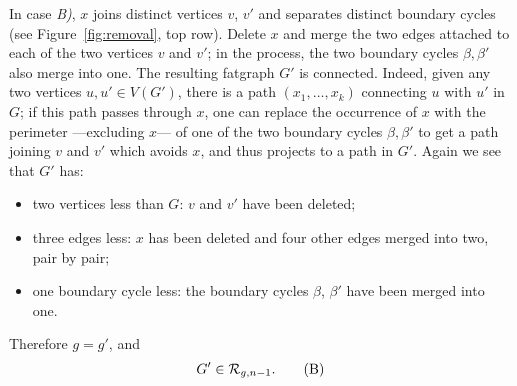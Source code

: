 In case {\slshape B)}, $x$ joins distinct vertices $v$,
$v'$ and separates distinct boundary cycles (see Figure~\ref{fig:removal},
top row).  Delete $x$ and merge the two edges attached to each of
the two vertices $v$ and $v'$; in the process, the two boundary cycles
$\beta, \beta'$ also merge into one. The resulting fatgraph $G'$ is
connected. Indeed, given any two vertices $u, u' \in V(G')$, there is
a path $(x_1, \ldots, x_k)$ connecting $u$ with $u'$ in $G$; if this
path passes through $x$, one can replace the occurrence of $x$ with
the perimeter ---excluding $x$--- of one of the two boundary cycles
$\beta, \beta'$ to get a path joining $v$ and $v'$ which avoids $x$,
and thus projects to a path in $G'$.  Again we see that $G'$ has:
\begin{itemize}
\item two vertices less than $G$: $v$ and $v'$ have been deleted;
\item three edges less: $x$ has been deleted and four other
  edges merged into two, pair by pair;
\item one boundary cycle less: the boundary cycles $\beta$, $\beta'$
  have been merged into one.
\end{itemize}
Therefore $g=g'$, and 
\begin{equation}
G' \in \mathcal{R}_{g,n-1}.
\label{eq:B}\tag{B}
\end{equation}

